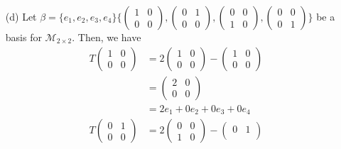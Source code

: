 \documentclass[13pt]{article}
\begin{document}
\begin{enumerate}[label=(\alph*),leftmargin=*]
\item [(d)] Let $\beta = \{ e_1, e_2, e_3, e_4 \}\{
  \begin{pmatrix}
    1 & 0 \\
    0 & 0 
  \end{pmatrix},
  \begin{pmatrix}
    0 & 1 \\
    0 & 0 
  \end{pmatrix},
  \begin{pmatrix}
    0 & 0 \\
    1 & 0 
  \end{pmatrix},
  \begin{pmatrix}
    0 & 0 \\
    0 & 1 
  \end{pmatrix}
  \}$ be a basis for $\mathcal{M}_{2 \times 2}$. Then, we have
  \begin{align*}
    T
    \begin{pmatrix}
      1 & 0 \\
      0 & 0 
    \end{pmatrix} &= 2
                    \begin{pmatrix}
                      1 & 0 \\
                      0 & 0
                    \end{pmatrix} -
                    \begin{pmatrix}
                      1 & 0 \\
                      0 & 0
                    \end{pmatrix} \\
        &=
          \begin{pmatrix}
            2 & 0 \\
            0 & 0
          \end{pmatrix} \\
        &= 2e_1 + 0e_2 + 0e_3 + 0e_4 \\
    T
    \begin{pmatrix}
      0 & 1 \\
      0 & 0 
    \end{pmatrix} &= 2
                    \begin{pmatrix}
                      0 & 0 \\
                      1 & 0
                    \end{pmatrix} -
                    \begin{pmatrix}
                      0 & 1 \\

\end{pmatrix}
\end{align*}
\end{enumerate}
\end{document}
